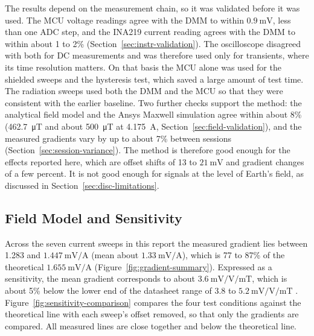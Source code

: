 \documentclass[12pt,a4paper]{article}
\begin{document}
The results depend on the measurement chain, so it was validated before it was used. The MCU voltage readings agree with the DMM to within $\SI{0.9}{\milli\volt}$, less than one ADC step, and the INA219 current reading agrees with the DMM to within about 1 to 2\% (Section~\ref{sec:instr-validation}). The oscilloscope disagreed with both for DC measurements and was therefore used only for transients, where its time resolution matters. On that basis the MCU alone was used for the shielded sweeps and the hysteresis test, which saved a large amount of test time. The radiation sweeps used both the DMM and the MCU so that they were consistent with the earlier baseline. Two further checks support the method: the analytical field model and the Ansys Maxwell simulation agree within about 8\% (\SI{462.7}{\micro\tesla} and about \SI{500}{\micro\tesla} at \SI{4.175}{\ampere}, Section~\ref{sec:field-validation}), and the measured gradients vary by up to about 7\% between sessions (Section~\ref{sec:session-variance}). The method is therefore good enough for the effects reported here, which are offset shifts of 13 to $\SI{21}{\milli\volt}$ and gradient changes of a few percent. It is not good enough for signals at the level of Earth's field, as discussed in Section~\ref{sec:disc-limitations}.

\subsection{Field Model and Sensitivity}
\label{sec:disc-model}

Across the seven current sweeps in this report the measured gradient lies between 1.283 and $\SI{1.447}{\milli\volt\per\ampere}$ (mean about $\SI{1.33}{\milli\volt\per\ampere}$), which is 77 to 87\% of the theoretical $\SI{1.655}{\milli\volt\per\ampere}$ (Figure~\ref{fig:gradient-summary}). Expressed as a sensitivity, the mean gradient corresponds to about $\SI{3.6}{\milli\volt\per\volt\per\milli\tesla}$, which is about 5\% below the lower end of the datasheet range of 3.8 to $\SI{5.2}{\milli\volt\per\volt\per\milli\tesla}$ \cite{ct100_datasheet}. Figure~\ref{fig:sensitivity-comparison} compares the four test conditions against the theoretical line with each sweep's offset removed, so that only the gradients are compared. All measured lines are close together and below the theoretical line.
\end{document}
